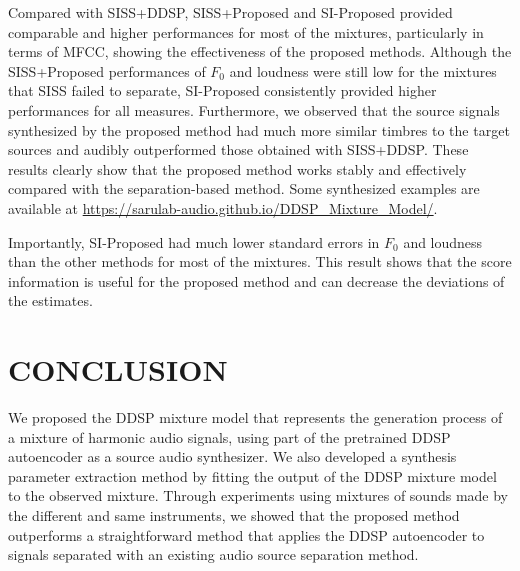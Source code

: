 \documentclass{article}
\begin{document}
Compared with SISS+DDSP, SISS+Proposed and SI-Proposed provided comparable and higher performances for most of the mixtures, particularly in terms of MFCC, showing the effectiveness of the proposed methods.
Although the SISS+Proposed performances of $F_0$ and loudness were still low for the mixtures that SISS failed to separate, SI-Proposed consistently provided higher performances for all measures.
Furthermore, we observed that the source signals synthesized by the proposed method had much more similar timbres to the target sources and audibly outperformed those obtained with SISS+DDSP.
These results clearly show that the proposed method works stably and effectively compared with the separation-based method. Some synthesized examples are available at \url{https://sarulab-audio.github.io/DDSP_Mixture_Model/}.

Importantly, SI-Proposed had much lower standard errors in $F_0$ and loudness than the other methods for most of the mixtures.
This result shows that the score information is useful for the proposed method and can decrease the deviations of the estimates.

\section{CONCLUSION}
We proposed the DDSP mixture model that represents the generation process of a mixture of harmonic audio signals, using part of the pretrained DDSP autoencoder as a source audio synthesizer.
We also developed a synthesis parameter extraction method by fitting the output of the DDSP mixture model to the observed mixture.
Through experiments using mixtures of sounds made by the different and same instruments, we showed that the proposed method outperforms a straightforward method that applies the DDSP autoencoder to signals separated with an existing audio source separation method.

\vfill\pagebreak


\end{document}

